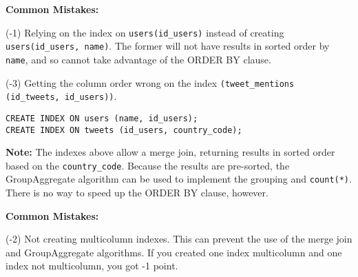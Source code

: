 \documentclass[12pt]{exam}
\theoremstyle{definition}
\begin{document}
\begin{questions}
\begin{solution}
\textbf{Common Mistakes:}

(-1) 
    Relying on the index on \lstinline{users(id_users)} instead of creating \lstinline{users(id_users, name)}.
    The former will not have results in sorted order by \lstinline{name}, and so cannot take advantage of the ORDER BY clause.

(-3) Getting the column order wrong on the index \lstinline{(tweet_mentions (id_tweets, id_users))}.
\end{solution}


\newpage
{}

\begin{solution}

\begin{lstlisting}
CREATE INDEX ON users (name, id_users);
CREATE INDEX ON tweets (id_users, country_code);
\end{lstlisting}

\noindent
\textbf{Note:}
The indexes above allow a merge join, returning results in sorted order based on the \lstinline{country_code}.
Because the results are pre-sorted, the GroupAggregate algorithm can be used to implement the grouping and \lstinline{count(*)}.
There is no way to speed up the ORDER BY clause, however.

\textbf{Common Mistakes:}

(-2) Not creating multicolumn indexes.  This can prevent the use of the merge join and GroupAggregate algorithms.
If you created one index multicolumn and one index not multicolumn, you got -1 point.
\end{solution}

\newpage
{}


\end{questions}
\end{document}
